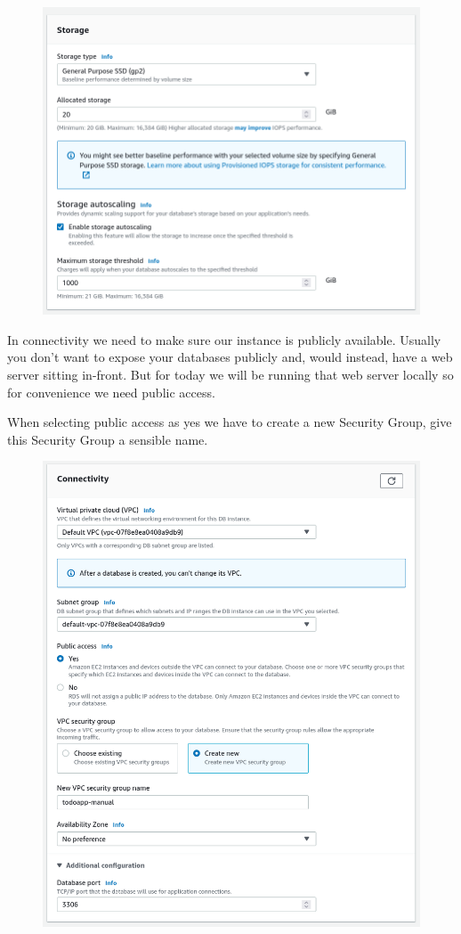 \documentclass{csse4400}
\begin{document}
\begin{figure}[H]
  \includegraphics[width=\textwidth]{images/db5}
\end{figure}

In connectivity we need to make sure our instance is publicly available.
Usually you don't want to expose your databases publicly and, would instead, have a web server sitting in-front.
But for today we will be running that web server locally so for convenience we need public access.

When selecting public access as yes we have to create a new Security Group,
give this Security Group a sensible name.

\begin{figure}[H]
  \includegraphics[width=\textwidth]{images/db6}
\end{figure}
\end{document}

